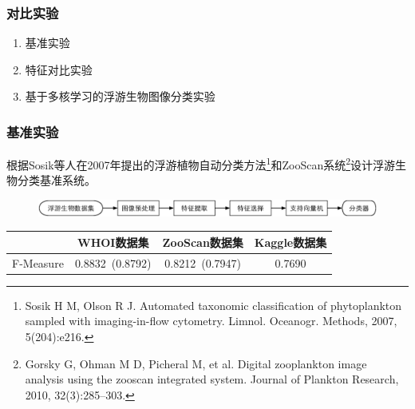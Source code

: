 \documentclass[notheorems,mathserif,table,compress]{beamer}  %
\begin{document}
\begin{frame}
\frametitle{对比实验}
\begin{enumerate}
\item 基准实验
\item 特征对比实验
\item 基于多核学习的浮游生物图像分类实验
\end{enumerate}
\end{frame}

\begin{frame}
\frametitle{基准实验}
根据Sosik等人在2007年提出的浮游植物自动分类方法\footnote{Sosik H M, Olson R J. Automated taxonomic classification of phytoplankton sampled with imaging-in-flow cytometry. Limnol. Oceanogr. Methods, 2007, 5(204):e216.}和ZooScan系统\footnote{Gorsky G, Ohman M D, Picheral M, et al. Digital zooplankton image analysis using the zooscan integrated system. Journal of Plankton Research, 2010, 32(3):285–303.}设计浮游生物分类基准系统。
\begin{figure}
\includegraphics[width=1\linewidth]{jizhun}
\end{figure}
\begin{table}[htbp]
  \scriptsize
  \centering
  \begin{tabular}[c]{cccc}
    \toprule
    ~ & WHOI数据集 & ZooScan数据集 & Kaggle数据集\\
    \midrule
    F-Measure & 0.8832~{\color{blue}(0.8792)} & 0.8212~{\color{blue}(0.7947)} & 0.7690\\
    \bottomrule
  \end{tabular}
\end{table}
\end{frame}
\end{document}
